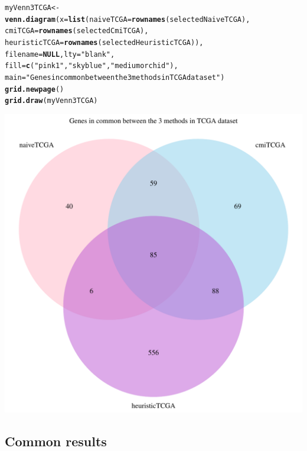 \documentclass[a4paper,10pt]{article}\usepackage[]{graphicx}\usepackage[]{color}
\makeatletter
\def\maxwidth{ %
  \ifdim\Gin@nat@width>\linewidth
    \linewidth
  \else
    \Gin@nat@width
  \fi
}
\newcommand{\hlstr}[1]{\textcolor[rgb]{0.192,0.494,0.8}{#1}}%
\newcommand{\hlstd}[1]{\textcolor[rgb]{0.345,0.345,0.345}{#1}}%
\newcommand{\hlkwa}[1]{\textcolor[rgb]{0.161,0.373,0.58}{\textbf{#1}}}%
\newcommand{\hlkwb}[1]{\textcolor[rgb]{0.69,0.353,0.396}{#1}}%
\newcommand{\hlkwc}[1]{\textcolor[rgb]{0.333,0.667,0.333}{#1}}%
\newcommand{\hlkwd}[1]{\textcolor[rgb]{0.737,0.353,0.396}{\textbf{#1}}}%
\newenvironment{kframe}{%
 \def\at@end@of@kframe{}%
 \ifinner\ifhmode%
  \def\at@end@of@kframe{\end{minipage}}%
  \begin{minipage}{\columnwidth}%
 \fi\fi%
 \def\FrameCommand##1{\hskip\@totalleftmargin \hskip-\fboxsep
 \colorbox{shadecolor}{##1}\hskip-\fboxsep
     \hskip-\linewidth \hskip-\@totalleftmargin \hskip\columnwidth}%
 \MakeFramed {\advance\hsize-\width
   \@totalleftmargin\z@ \linewidth\hsize
   \@setminipage}}%
 {\par\unskip\endMakeFramed%
 \at@end@of@kframe}
\newenvironment{knitrout}{}{} %
\makeatother
\begin{document}
\begin{knitrout}
\color{fgcolor}\begin{kframe}
\begin{alltt}
\hlstd{myVenn3TCGA} \hlkwb{<-} \hlkwd{venn.diagram}\hlstd{(}\hlkwc{x}\hlstd{=}\hlkwd{list}\hlstd{(}\hlkwc{naiveTCGA}\hlstd{=}\hlkwd{rownames}\hlstd{(selectedNaiveTCGA),}
                                \hlkwc{cmiTCGA}\hlstd{=}\hlkwd{rownames}\hlstd{(selectedCmiTCGA),}
                                \hlkwc{heuristicTCGA} \hlstd{=} \hlkwd{rownames}\hlstd{(selectedHeuristicTCGA)),}
                                \hlkwc{filename}\hlstd{=}\hlkwa{NULL}\hlstd{,} \hlkwc{lty} \hlstd{=} \hlstr{"blank"}\hlstd{,}
                                \hlkwc{fill}\hlstd{=}\hlkwd{c}\hlstd{(}\hlstr{"pink1"}\hlstd{,} \hlstr{"skyblue"}\hlstd{,} \hlstr{"mediumorchid"}\hlstd{),}
                       \hlkwc{main}\hlstd{=}\hlstr{"Genes in common between the 3 methods in TCGA dataset"}\hlstd{)}
\hlkwd{grid.newpage}\hlstd{()}
\hlkwd{grid.draw}\hlstd{(myVenn3TCGA)}
\end{alltt}
\end{kframe}
\includegraphics[width=\maxwidth]{figure/compare3TCGA-1} 

\end{knitrout}

\subsection{Common results}
\end{document}
